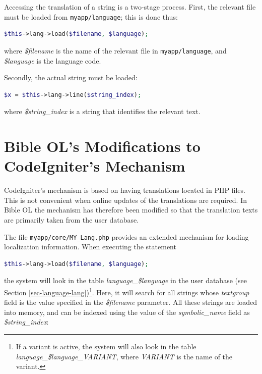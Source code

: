 \documentclass[11pt,oneside,a4paper]{memoir}
\begin{document}
Accessing the translation of a string is a two-stage process. First, the relevant file must be loaded
from \texttt{myapp/language}; this is done thus:

\begin{lstlisting}[language=PHP]
$this->lang->load($filename, $language);
\end{lstlisting}

\noindent
where \emph{\$filename} is the name of the relevant file in \texttt{myapp/language}, and
\emph{\$language} is the language code.

Secondly, the actual string must be loaded:

\begin{lstlisting}[language=PHP]
$x = $this->lang->line($string_index);
\end{lstlisting}

\noindent
where \emph{\$string\_index} is a string that identifies the relevant text.



\section{Bible OL's Modifications to CodeIgniter's Mechanism}\label{sec-loc-user-interface}

CodeIgniter's mechanism is based on having translations located in PHP files. This is not convenient
when online updates of the translations are required. In Bible OL the mechanism has therefore been modified
so that the translation texts are primarily taken from the user database.

The file \texttt{myapp/core/MY\_Lang.php} provides an extended mechanism for loading localization
information. When executing the statement

\begin{lstlisting}[language=PHP]
$this->lang->load($filename, $language);
\end{lstlisting}

\noindent
the system will look in the table \emph{language\_\$language} in the user database (see Section
\ref{sec-language-lang})\footnote{If a variant is active, the system will also look in the table
  \emph{language\_\$language\_VARIANT}, where \emph{VARIANT} is the name of the
  variant.}. Here, it will search for all strings whose \emph{textgroup} field is the value specified
in the \emph{\$filename} parameter. All these strings are loaded into memory, and can be indexed
using the value of the \emph{symbolic\_name} field as \emph{\$string\_index}:
\end{document}
